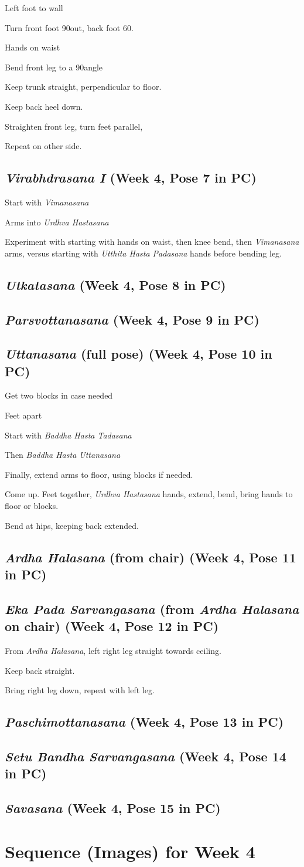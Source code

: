 \documentclass{book}
\newcommand{\apose}[1]{\emph{#1}}
\newcommand{\ardhal}{\apose{Ardha Halasana}}
\newcommand{\badhasttad}{\apose{Baddha Hasta Tadasana}}
\newcommand{\badhastutt}{\apose{Baddha Hasta Uttanasana}}
\newcommand{\ekapadsarv}{\apose{Eka Pada Sarvangasana}}
\newcommand{\parsvo}{\apose{Parsvottanasana}}
\newcommand{\paschi}{\apose{Paschimottanasana}}
\newcommand{\sav}{\apose{Savasana}}
\newcommand{\setubandsarv}{\apose{Setu Bandha Sarvangasana}}
\newcommand{\urdhast}{\apose{Urdhva Hastasana}}
\newcommand{\utka}{\apose{Utkatasana}}
\newcommand{\utt}{\apose{Uttanasana}}
\newcommand{\utthastpad}{\apose{Utthita Hasta Padasana}}
\newcommand{\vim}{\apose{Vimanasana}}
\newcommand{\virai}{\apose{Virabhdrasana I}}
\newcommand{\PC}[2]{{\normalfont\normalsize \hfill(Week #1, Pose #2 in PC)}}
\newcommand{\newpose}[1]{{{#1}}}
\newcounter{pose}
\newcommand{\pose}{\subsection}
\begin{document}
Left foot to wall

Turn front foot 90\textdegree out, back foot 60\textdegree.

Hands on waist

Bend front leg to a 90\textdegree angle

Keep trunk straight, perpendicular to floor.

Keep back heel down.

Straighten front leg, turn feet parallel,

Repeat on other side.

\pose{\newpose{\virai{}} \PC{4}{7}}

Start with \vim{}

Arms into \urdhast{}

Experiment with starting with hands on waist, then knee bend, then
\vim{} arms, versus starting with \utthastpad{} hands before
bending leg.

\pose{\utka{}  \PC{4}{8}}

\pose{\parsvo{} \PC{4}{9}}

\pose{\newpose{\utt{}} (full pose) \PC{4}{10}}

Get two blocks in case needed

Feet apart

Start with \badhasttad{}

Then \badhastutt{}

Finally, extend arms to floor, using blocks if needed.

Come up. Feet together, \urdhast{} hands, extend, bend, bring
hands to floor or blocks.

Bend at hips, keeping back extended.

\pose{\ardhal{} (from chair) \PC{4}{11}}

\pose{\newpose{\ekapadsarv{}} (from \ardhal{} on chair) \PC{4}{12}}

From \ardhal{}, left right leg straight towards ceiling.

Keep back straight.

Bring right leg down, repeat with left leg.

\pose{\paschi{} \PC{4}{13}}

\pose{\setubandsarv{} \PC{4}{14}}

\pose{\sav{} \PC{4}{15}}


\section{Sequence (Images) for Week 4}
\label{seqimags:4}
\end{document}
